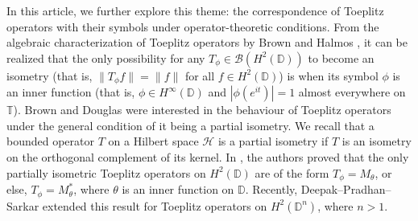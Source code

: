 \documentclass[12pt]{amsart}
\theoremstyle{definition}
\newcommand{\D}{\mathbb{D}}
\newcommand{\1}{{\mbox{\bf 1}}}
\newcommand{\clb}{\mathcal{B}}
\newcommand{\clh}{\mathcal{H}}
\begin{document}
In this article, we further explore this theme: the correspondence of Toeplitz operators with their symbols under operator-theoretic conditions.  From the algebraic characterization of Toeplitz operators by Brown and Halmos \cite{BH}, it can be realized that the only possibility for any $T_{\phi} \in \clb(H^2(\D))$ to become an isometry (that is, $\|T_{\phi}f\| = \|f\|$ for all $f \in H^2(\D)$) is when its symbol $\phi$ is an inner function (that is, $\phi \in H^{\infty}(\D)$ and $|\phi(e^{it})|=1$ almost everywhere on $\mathbb{T}$). Brown and Douglas were interested in the behaviour of Toeplitz operators under the general condition of it being a partial isometry. We recall that a bounded operator $T$ on a Hilbert space $\clh$ is a partial isometry if $T$ is an isometry on the orthogonal complement of its kernel. In \cite{BD}, the authors proved that the only partially isometric Toeplitz operators on $H^2(\D)$ are of the form $T_{\phi} = M_{\theta}$, or else, $T_{\phi} = M_{\theta}^*$, where $\theta$ is an inner function on $\D$. Recently, Deepak--Pradhan--Sarkar extended this result for Toeplitz operators on $H^2(\D^n)$, where $n>1$.
\end{document}
